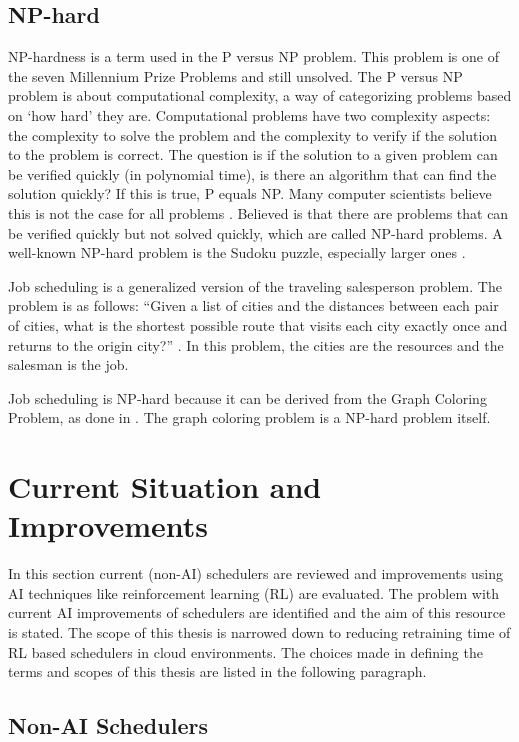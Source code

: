 \subsection{NP-hard}

NP-hardness is a term used in the P versus NP problem. This problem is one of
the seven Millennium Prize Problems \cite{carlson2006} and still unsolved. The
P versus NP problem is about computational complexity, a way of categorizing
problems based on `how hard' they are. Computational problems have two
complexity aspects: the complexity to solve the problem and the complexity to
verify if the solution to the problem is correct. The question is if the
solution to a given problem can be verified quickly (in polynomial time), is
there an algorithm that can find the solution quickly? If this is true, P
equals NP. Many computer scientists believe this is not the case for all
problems \cite{rosenberger2012}. Believed is that there are problems that can be verified quickly but
not solved quickly, which are called NP-hard problems. A well-known NP-hard
problem is the Sudoku puzzle, especially larger ones \cite{yato2003}.

Job scheduling is a generalized version of the traveling salesperson problem.
The problem is as follows: ``Given a list of cities and the distances between
each pair of cities, what is the shortest possible route that visits each city
exactly once and returns to the origin city?'' \cite{flood1956}. In this
problem, the cities are the resources and the salesman is the job.

Job scheduling is NP-hard because it can be derived from the Graph Coloring
Problem, as done in . The graph coloring problem is a
NP-hard problem itself.


\section{Current Situation and Improvements}\label{sec:situ}

In this section current (non-AI) schedulers are reviewed and improvements
using AI techniques like reinforcement learning (RL) are evaluated. The problem
with current AI improvements of schedulers are identified and the aim of this
resource is stated. The scope of this thesis is narrowed down to reducing
retraining time of RL based schedulers in cloud
environments. The choices made in defining the terms and scopes of this thesis
are listed in the following paragraph.

\subsection{Non-AI Schedulers}

